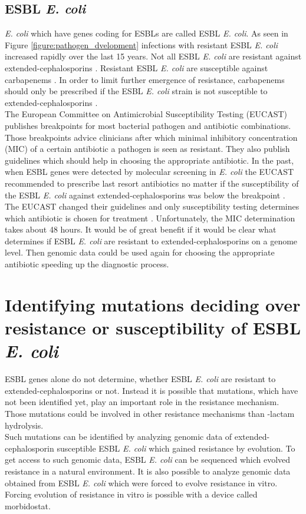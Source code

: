 \subsection{ESBL \textit{E. coli}}
\textit{E. coli} which have genes coding for ESBLs are called ESBL \textit{E. coli}. As seen in Figure \ref{figure:pathogen_dvelopment} infections with resistant ESBL \textit{E. coli} increased rapidly over the last 15 years. Not all ESBL \textit{E. coli} are resistant against extended-cephalosporins \cite{mcwilliams_incidence_2014}. Resistant ESBL \textit{E. coli} are susceptible against carbapenems \cite{fernandes_-lactams:_2013}. In order to limit further emergence of resistance, carbapenems should only be prescribed if the ESBL \textit{E. coli} strain is not susceptible to extended-cephalosporins . \\
The European Committee on Antimicrobial Susceptibility Testing (EUCAST) publishes breakpoints for most bacterial pathogen and antibiotic combinations. Those breakpoints advice clinicians after which minimal inhibitory concentration (MIC) of a certain antibiotic a pathogen is seen as resistant. They also publish guidelines which should help in choosing the appropriate antibiotic. 
In the past, when ESBL genes were detected by molecular screening in \textit{E. coli} the EUCAST recommended to prescribe last resort antibiotics no matter if the susceptibility of the ESBL \textit{E. coli} against extended-cephalosporins was below the breakpoint \cite{leclercq_eucast_2013}. The EUCAST changed their guidelines and only susceptibility testing determines which antibiotic is chosen for treatment \cite{leclercq_eucast_2013}. Unfortunately, the MIC determination takes about 48 hours. It would be of great benefit if it would be clear what determines if ESBL \textit{E. coli} are resistant to extended-cephalosporins on a genome level. Then genomic data could be used again for choosing the appropriate antibiotic speeding up the diagnostic process. \\ 

\section{Identifying mutations deciding over resistance or susceptibility of ESBL \textit{E. coli}}
ESBL genes alone do not determine, whether ESBL \textit{E. coli} are resistant to extended-cephalosporins or not. Instead it is possible that mutations, which have not been identified yet, play an important role in the resistance mechanism. Those mutations could be involved in other resistance mechanisms than \textbeta-lactam hydrolysis. \\
Such mutations can be identified by analyzing genomic data of extended-cephalosporin susceptible ESBL \textit{E. coli} which gained resistance by evolution. To get access to such genomic data, ESBL \textit{E. coli} can be sequenced which evolved resistance in a natural environment. It is also possible to analyze genomic data obtained from ESBL \textit{E. coli} which were forced to evolve resistance in vitro. Forcing evolution of resistance in vitro is possible with a device called morbidostat.

